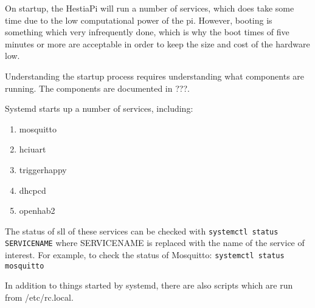 On startup, the HestiaPi will run a number of services, which does take some
time due to the low computational power of the pi.  However, booting is
something which very infrequently done, which is why the boot times of five
minutes or more are acceptable in order to keep the size and cost of the
hardware low.

Understanding the startup process requires understanding what components are
running.  The components are documented in ???.

Systemd starts up a number of services, including:
\begin{enumerate}
  \item mosquitto
  \item hciuart
  \item triggerhappy
  \item dhcpcd
  \item openhab2
\end{enumerate}

The status of sll of these services can be checked with
\texttt{systemctl status SERVICENAME} where SERVICENAME is replaced with the
name of the service of interest. For example, to check the status of Mosquitto:
\texttt{systemctl status mosquitto}

In addition to things started by systemd, there are also scripts which are run
from /etc/rc.local.

